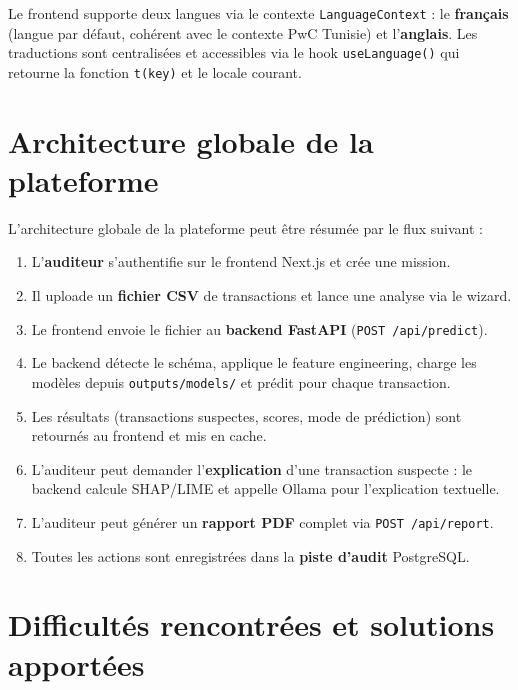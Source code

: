 \documentclass[12pt,a4paper,twoside]{report}
\begin{document}
Le frontend supporte deux langues via le contexte \texttt{LanguageContext} : le \textbf{français} (langue par défaut, cohérent avec le contexte PwC Tunisie) et l'\textbf{anglais}. Les traductions sont centralisées et accessibles via le hook \texttt{useLanguage()} qui retourne la fonction \texttt{t(key)} et le locale courant.

\section{Architecture globale de la plateforme}

L'architecture globale de la plateforme peut être résumée par le flux suivant :

\begin{enumerate}
  \item L'\textbf{auditeur} s'authentifie sur le frontend Next.js et crée une mission.
  \item Il uploade un \textbf{fichier CSV} de transactions et lance une analyse via le wizard.
  \item Le frontend envoie le fichier au \textbf{backend FastAPI} (\texttt{POST /api/predict}).
  \item Le backend détecte le schéma, applique le feature engineering, charge les modèles depuis \texttt{outputs/models/} et prédit pour chaque transaction.
  \item Les résultats (transactions suspectes, scores, mode de prédiction) sont retournés au frontend et mis en cache.
  \item L'auditeur peut demander l'\textbf{explication} d'une transaction suspecte : le backend calcule SHAP/LIME et appelle Ollama pour l'explication textuelle.
  \item L'auditeur peut générer un \textbf{rapport PDF} complet via \texttt{POST /api/report}.
  \item Toutes les actions sont enregistrées dans la \textbf{piste d'audit} PostgreSQL.
\end{enumerate}

\section{Difficultés rencontrées et solutions apportées}
\end{document}
